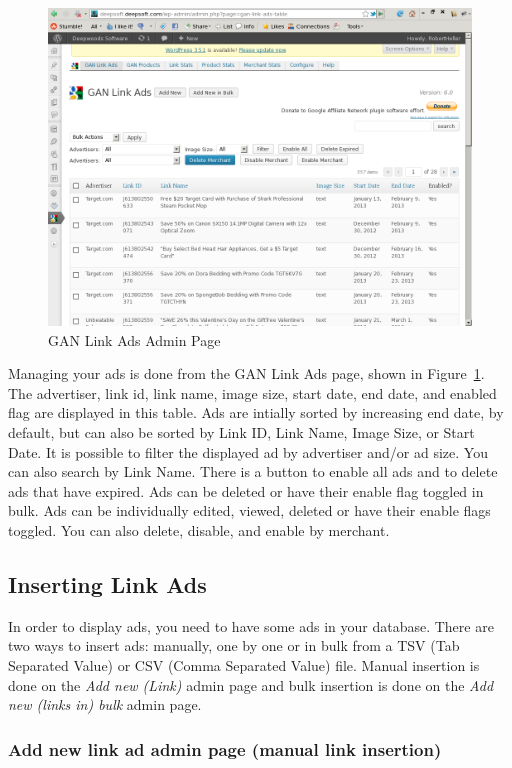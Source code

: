 \documentclass[letterpaper]{article}
\begin{document}
\begin{figure}[ht] \begin{centering}
\includegraphics[width=4.5in]{ganlinkads.png} 
\caption{GAN Link Ads Admin Page} 
\label{fig:ganlinkads} 
\end{centering} 
\end{figure} 
Managing your ads is done from the GAN Link Ads page, shown in
Figure~\ref{fig:ganlinkads}. The advertiser, link id, link name, image size,
start date, end date, and enabled flag are displayed in this table. Ads
are intially sorted by increasing end date, by default, but can also be sorted
by  Link ID, Link Name, Image Size, or Start Date.  It is possible to
filter the displayed ad by advertiser and/or ad size.  You can also
search by Link Name. There is a button to enable all ads and to delete
ads that have expired.  Ads can be deleted or have their enable flag
toggled in bulk.  Ads can be individually edited, viewed, deleted or
have their enable flags toggled.  You can also delete, disable, and
enable by merchant.

\subsection{Inserting Link Ads}

In order to display ads, you need to have some ads in your database.
There are two ways to insert ads: manually, one by one or in bulk from
a TSV (Tab Separated Value) or CSV (Comma Separated Value) file. Manual
insertion is done on the \emph{Add new (Link)} admin page and bulk insertion
is done on the \emph{Add new (links in) bulk} admin page.

\subsubsection{Add new link ad admin page (manual link insertion)}
\end{document}
